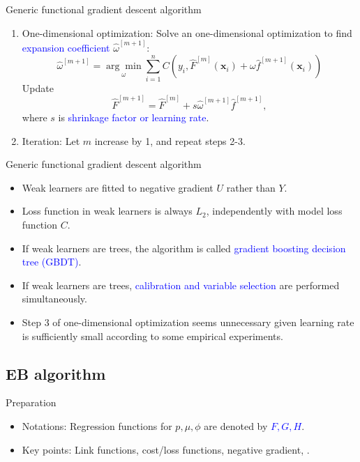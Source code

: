 \documentclass[professionalfont]{beamer}
\newcounter{saveenumi}
\newcommand{\conti}{\setcounter{enumi}{\value{saveenumi}}}
\def\bx{\boldsymbol{x}}
\newcommand{\blue}[1]{\textcolor{blue}{#1}}
\begin{document}
\begin{frame}{Generic functional gradient descent algorithm}	
\begin{enumerate}
\conti
		\item One-dimensional optimization:
		Solve an one-dimensional optimization  to find \blue{expansion coefficient} $\hat{\omega}^{[m+1]}$:
		$$\hat{\omega}^{[m+1]}=\underset{\omega}{\arg\min}\sum_{i=1}^n C(y_i, \hat{F}^{[m]}(\bx_i)+\omega\hat{f}^{[m+1]}(\bx_i))$$
		Update $$\hat{F}^{[m+1]}=\hat{F}^{[m]}+s\hat{\omega}^{[m+1]}\hat{f}^{[m+1]},$$
		where $s$ is \blue{shrinkage factor or learning rate}.
		\item Iteration: Let $m$ increase by 1, and repeat steps 2-3.
		
	\end{enumerate}	
\end{frame}

\begin{frame}{Generic functional gradient descent algorithm}
	
	\begin{itemize}
		\item Weak learners are fitted to negative gradient $U$ rather than $Y$.
		\item Loss function in weak learners is always $L_2$, independently with model loss function $C$.
		\item If weak learners are trees, the algorithm is called \blue{gradient boosting decision tree (GBDT)}.
		\item If weak learners are trees,  \blue{calibration and variable selection} are performed simultaneously.
		\item Step 3 of one-dimensional optimization seems unnecessary given learning rate is sufficiently small according to some empirical experiments. 
	\end{itemize}	
\end{frame}

\subsection{EB algorithm}

\begin{frame}{Preparation}
	

	
	\begin{itemize}
		\item 	Notations: Regression functions for $p,\mu,\phi$ are denoted by \blue{$F,G,H$}.
	
		\item Key points: Link functions, cost/loss functions, negative gradient, .
		
	\end{itemize}
	
\end{frame}
\end{document}
